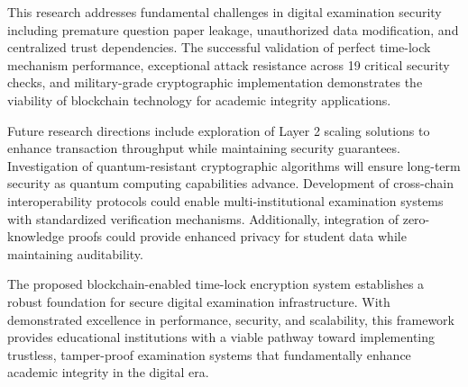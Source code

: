 \documentclass[12pt,a4paper]{article}
\newlength{\defbaselineskip}
\newcommand{\setlinespacing}[1]%
           {\setlength{\baselineskip}{#1 \defbaselineskip}}
\begin{document}
This research addresses fundamental challenges in digital examination security including premature question paper leakage, unauthorized data modification, and centralized trust dependencies. The successful validation of perfect time-lock mechanism performance, exceptional attack resistance across 19 critical security checks, and military-grade cryptographic implementation demonstrates the viability of blockchain technology for academic integrity applications.

Future research directions include exploration of Layer 2 scaling solutions to enhance transaction throughput while maintaining security guarantees. Investigation of quantum-resistant cryptographic algorithms will ensure long-term security as quantum computing capabilities advance. Development of cross-chain interoperability protocols could enable multi-institutional examination systems with standardized verification mechanisms. Additionally, integration of zero-knowledge proofs could provide enhanced privacy for student data while maintaining auditability.

The proposed blockchain-enabled time-lock encryption system establishes a robust foundation for secure digital examination infrastructure. With demonstrated excellence in performance, security, and scalability, this framework provides educational institutions with a viable pathway toward implementing trustless, tamper-proof examination systems that fundamentally enhance academic integrity in the digital era.


\setlinespacing{1}

\newpage

\end{document}
